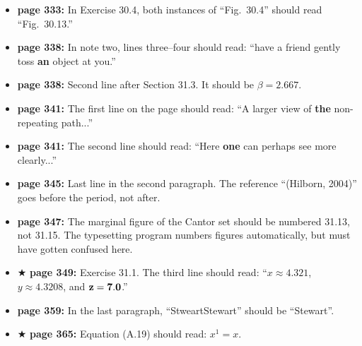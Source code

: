 \documentclass[12pt]{article}
\begin{document}
\begin{itemize}


  \item {\bf page 333:}  In Exercise 30.4, both instances of
    ``Fig.~30.4'' should read ``Fig.~30.13.''

  \item {\bf page 338:}  In note two, lines three--four should read:
    ``have a friend gently toss {\bf an} object at you.'' %

  \item {\bf page 338:}  Second line after Section 31.3.  It should be
    $\beta = 2.667$.


  \item {\bf page 341:}  The first line on the page should read: ``A
    larger view of {\bf the} non-repeating path...'' %
  
  \item {\bf page 341:}  The second line should read: ``Here {\bf one}
    can perhaps see more clearly...'' %

  \item {\bf page 345:}  Last line in the second paragraph.  The
    reference ``(Hilborn, 2004)'' goes before the period, not
    after. %

  \item {\bf page 347:}  The marginal figure of the Cantor set should
    be numbered 31.13, not 31.15.  The typesetting program numbers
    figures automatically, but must have gotten confused here.  

  \item $\bigstar$ {\bf page 349:}  Exercise 31.1.  The third line
    should read: ``$x \approx 4.321$, $y \approx 4.3208$, and ${\bf z
      = 7.0}$.''


  \item {\bf page 359:} In the last paragraph, ``StweartStewart''
    should be ``Stewart''. 

  \item $\bigstar$ {\bf page 365:}  Equation (A.19) should read: $x^1
    = x$.  


\end{itemize}
\end{document}
